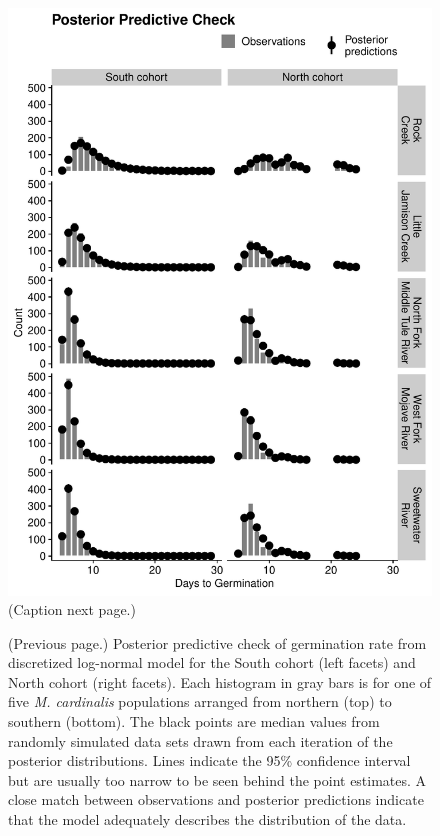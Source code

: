 \documentclass[
  12pt,
]{article}
\begin{document}
\begin{figure}[ht]
  \includegraphics[width=\textwidth]{figures/pp_check_germ.pdf}
  \caption{(Caption next page.)}
  \label{fig:pp_check}
\end{figure}
\addtocounter{figure}{-1}
\begin{figure} [t!]
  \caption{(Previous page.) Posterior predictive check of germination rate from discretized log-normal model for the South cohort (left facets) and North cohort (right facets). Each histogram in gray bars is for one of five \textit{M. cardinalis} populations arranged from northern (top) to southern (bottom). The black points are median values from randomly simulated data sets drawn from each iteration of the posterior distributions. Lines indicate the 95\% confidence interval but are usually too narrow to be seen behind the point estimates. A close match between observations and posterior predictions indicate that the model adequately describes the distribution of the data.}
\end{figure}
\end{document}
